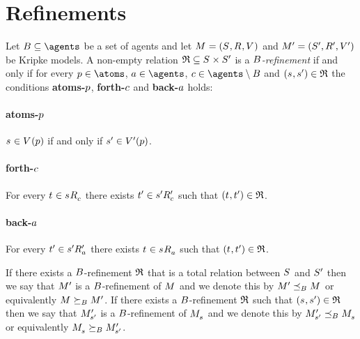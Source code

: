 \section{Refinements}

\begin{definition}[Refinements]\label{refinements}
Let $\agentsB \subseteq \agents$ be a set of agents and let $\kModelAndTuple$ and $\kModelAndTupleP$ be Kripke models.
A non-empty relation $\refinement \subseteq \kStates \times \kStatesP$ is a {\em $B$-refinement} if and only if for every $\atomP \in \atoms$, $\agentA \in \agents$, $\agentC \in \agents \setminus \agentsB$ and $(\kStateS, \kStateSP) \in \refinement$ the conditions {\bf atoms-$p$}, {\bf forth-$c$} and {\bf back-$a$} holds:

\paragraph{atoms-$p$}
$\kStateS \in \kValuation(\atomP)$ if and only if ${s}^{\prime} \in {V^{\prime}}(p)$.

\paragraph{forth-$c$}
For every $\kStateT \in \kSuccessorsC{\kStateS}$ there exists ${t}^{\prime} \in {{s}^{\prime}} {R^{\prime}_{c}}$ such that $(\kStateT, \kStateTP) \in \refinement$.

\paragraph{back-$a$}
For every ${t}^{\prime} \in {{s}^{\prime}} {R^{\prime}_{a}}$ there exists $\kStateT \in \kSuccessorsA{\kStateS}$ such that $(\kStateT, \kStateTP) \in \refinement$.

If there exists a $B$-refinement $\mathfrak{R}$ that is a total relation between $\kStates$ and ${S^{\prime}}$ then we say that ${M^{\prime}_{}}$ is a $B$-refinement of $\kModel$ and we denote this by $\kModelP \refinesBs \kModel$ or equivalently $\kModel \simulatesBs \kModelP$.
If there exists a $B$-refinement $\mathfrak{R}$ such that $(\kStateS, \kStateSP) \in \refinement$ then we say that ${M^{\prime}_{{s}^{\prime}}}$ is a $B$-refinement of $\kPModel{\kStateS}$ and we denote this by $\kPModelP{\kStateSP} \refinesBs \kPModel{\kStateS}$ or equivalently $\kPModel{\kStateS} \simulatesBs \kPModelP{\kStateSP}$.
\end{definition}

